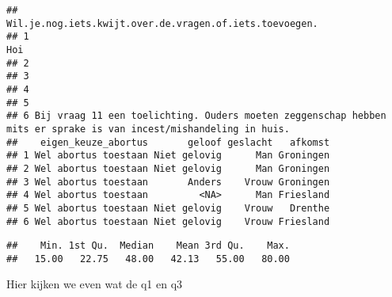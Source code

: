 \documentclass[
]{article}
\newenvironment{Shaded}{\begin{snugshade}}{\end{snugshade}}
\newcommand{\AttributeTok}[1]{\textcolor[rgb]{0.13,0.29,0.53}{#1}}
\newcommand{\DecValTok}[1]{\textcolor[rgb]{0.00,0.00,0.81}{#1}}
\newcommand{\FunctionTok}[1]{\textcolor[rgb]{0.13,0.29,0.53}{\textbf{#1}}}
\newcommand{\NormalTok}[1]{#1}
\newcommand{\OtherTok}[1]{\textcolor[rgb]{0.56,0.35,0.01}{#1}}
\newcommand{\SpecialCharTok}[1]{\textcolor[rgb]{0.81,0.36,0.00}{\textbf{#1}}}
\newcommand{\StringTok}[1]{\textcolor[rgb]{0.31,0.60,0.02}{#1}}
\begin{document}
\begin{verbatim}
##                                                              Wil.je.nog.iets.kwijt.over.de.vragen.of.iets.toevoegen.
## 1                                                                                                                Hoi
## 2                                                                                                                   
## 3                                                                                                                   
## 4                                                                                                                   
## 5                                                                                                                   
## 6 Bij vraag 11 een toelichting. Ouders moeten zeggenschap hebben mits er sprake is van incest/mishandeling in huis. 
##    eigen_keuze_abortus       geloof geslacht   afkomst
## 1 Wel abortus toestaan Niet gelovig      Man Groningen
## 2 Wel abortus toestaan Niet gelovig      Man Groningen
## 3 Wel abortus toestaan       Anders    Vrouw Groningen
## 4 Wel abortus toestaan         <NA>      Man Friesland
## 5 Wel abortus toestaan Niet gelovig    Vrouw   Drenthe
## 6 Wel abortus toestaan Niet gelovig    Vrouw Friesland
\end{verbatim}

\begin{Shaded}
\end{Shaded}

\begin{verbatim}
##    Min. 1st Qu.  Median    Mean 3rd Qu.    Max. 
##   15.00   22.75   48.00   42.13   55.00   80.00
\end{verbatim}

Hier kijken we even wat de q1 en q3

\begin{Shaded}
\end{Shaded}
\end{document}
